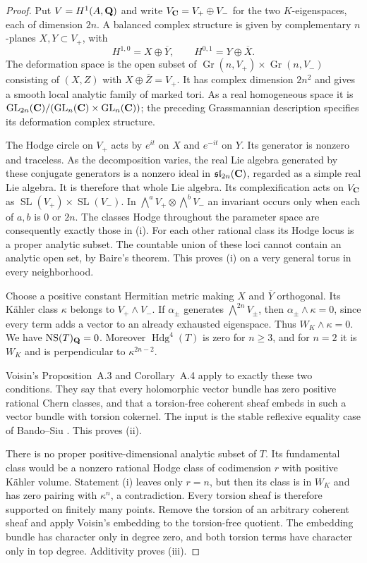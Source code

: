 \begin{proof}
Put $V=H^1(A,\mathbf Q)$ and write
$V_\mathbf C=V_+\oplus V_-$ for the two $K$-eigenspaces, each of
dimension $2n$.  A balanced complex structure is given by
complementary $n$-planes $X,Y\subset V_+$, with
\[
 H^{1,0}=X\oplus\overline Y,
 \qquad H^{0,1}=Y\oplus\overline X.
\]
The deformation space is the open subset of
$\operatorname{Gr}(n,V_+)\times\operatorname{Gr}(n,V_-)$
consisting of $(X,Z)$ with $X\oplus\overline Z=V_+$.
It has complex dimension $2n^2$ and gives a smooth local analytic
family of marked tori.  As a real homogeneous space it is
$\operatorname{GL}_{2n}(\mathbf C)/
(\operatorname{GL}_n(\mathbf C)\times\operatorname{GL}_n(\mathbf C))$;
the preceding Grassmannian description specifies its deformation
complex structure.

The Hodge circle on $V_+$ acts by $e^{it}$ on $X$ and $e^{-it}$
on $Y$.  Its generator is nonzero and traceless.  As the
decomposition varies, the real Lie algebra generated by these
conjugate generators is a nonzero ideal in
$\mathfrak{sl}_{2n}(\mathbf C)$, regarded as a simple real Lie algebra.
It is therefore that whole Lie algebra.  Its complexification
acts on $V_\mathbf C$ as
$\operatorname{SL}(V_+)\times\operatorname{SL}(V_-)$.
In $\bigwedge^a V_+\otimes\bigwedge^b V_-$ an invariant occurs
only when each of $a,b$ is $0$ or $2n$.  The classes Hodge
throughout the parameter space are consequently exactly those
in (i).  For each other rational class its Hodge locus is a
proper analytic subset.  The countable union of these loci
cannot contain an analytic open set, by Baire's theorem.
This proves (i) on a very general torus in every neighborhood.

Choose a positive constant Hermitian metric making $X$ and
$\overline Y$ orthogonal.  Its Kähler class $\kappa$ belongs
to $V_+\wedge V_-$.  If $\alpha_\pm$ generates
$\bigwedge^{2n}V_\pm$, then
$\alpha_\pm\wedge\kappa=0$, since every term adds a vector
to an already exhausted eigenspace.  Thus $W_K\wedge\kappa=0$.
We have $\operatorname{NS}(T)_\mathbf Q=0$.  Moreover
$\operatorname{Hdg}^4(T)$ is zero for $n\ge3$, and for $n=2$
it is $W_K$ and is perpendicular to $\kappa^{2n-2}$.

Voisin's Proposition~A.3 and Corollary~A.4
\cite[pp.~1072--1074]{VoisinKahler} apply to exactly these two
conditions.  They say that every holomorphic vector bundle has
zero positive rational Chern classes, and that a torsion-free
coherent sheaf embeds in such a vector bundle with torsion
cokernel.  The input is the stable reflexive equality case of
Bando--Siu \cite[Theorem~3 and Corollary~3, p.~40]{BandoSiu}.
This proves (ii).

There is no proper positive-dimensional analytic subset of $T$.
Its fundamental class would be a nonzero rational Hodge class
of codimension $r$ with positive Kähler volume.  Statement (i)
leaves only $r=n$, but then its class is in $W_K$ and has
zero pairing with $\kappa^n$, a contradiction.  Every torsion
sheaf is therefore supported on finitely many points.  Remove
the torsion of an arbitrary coherent sheaf and apply Voisin's
embedding to the torsion-free quotient.  The embedding bundle
has character only in degree zero, and both torsion terms have
character only in top degree.  Additivity proves (iii).
\end{proof}


